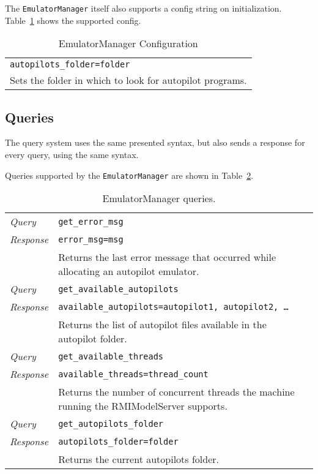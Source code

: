 The \texttt{EmulatorManager} itself also supports a config string on initialization. Table~\ref{tab:managerconfig} shows the supported config.
\begin{table}[!htb]
    \begin{tabularx}{\textwidth}{ | X |}
        \hline
        \texttt{autopilots\_folder=folder} \\
        Sets the folder in which to look for autopilot programs.\\ \hline
    \end{tabularx}
    \caption{EmulatorManager Configuration}
    \label{tab:managerconfig}
\end{table}

\subsection{Queries}

The query system uses the same presented syntax, but also sends a response for every query, using the same syntax.

Queries supported by the \texttt{EmulatorManager} are shown in Table~\ref{tab:managerqueries}.

\begin{table}[!htb]
    \begin{tabularx}{\textwidth}{ >{\em}l | X |}
        \cline{2-2}
        Query       & \texttt{get\_error\_msg} \\ 
        Response    & \texttt{error\_msg=msg}  \\
                    & Returns the last error message that occurred while allocating an autopilot emulator. \\ \cline{2-2}
        Query       & \texttt{get\_available\_autopilots} \\ 
        Response    & \texttt{available\_autopilots=autopilot1, autopilot2, \dots}  \\
                    & Returns the list of autopilot files available in the autopilot folder. \\ \cline{2-2}
        Query       & \texttt{get\_available\_threads} \\ 
        Response    & \texttt{available\_threads=thread\_count}  \\
                    & Returns the number of concurrent threads the machine running the RMIModelServer supports.\\ \cline{2-2}
        Query       & \texttt{get\_autopilots\_folder} \\ 
        Response    & \texttt{autopilots\_folder=folder}  \\
                    & Returns the current autopilots folder.\\ \cline{2-2}
    \end{tabularx}
    \caption{EmulatorManager queries.}
    \label{tab:managerqueries}
\end{table}

